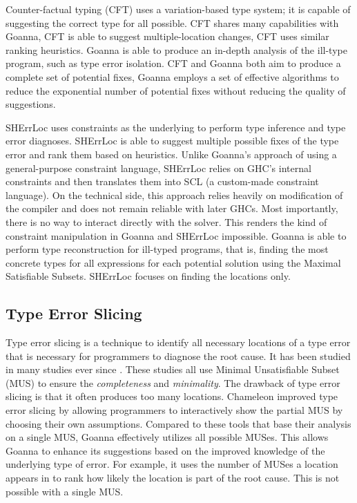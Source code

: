 \documentclass[pdflatex,sn-mathphys-num]{sn-jnl}%
\begin{document}
   Counter-factual typing (CFT) \cite{Chen2014-dz,Chen2020-ad} uses a variation-based type system; it is capable of suggesting the correct type for all possible. CFT shares many capabilities with Goanna, CFT is able to suggest multiple-location changes, CFT uses similar ranking heuristics. Goanna is able to produce an in-depth analysis of the ill-type program, such as type error isolation. CFT and Goanna both aim to produce a complete set of potential fixes, Goanna employs a set of effective algorithms to reduce the exponential number of potential fixes without reducing the quality of suggestions. 
   
   SHErrLoc \cite{Zhang2015-xy} uses constraints as the underlying to perform type inference and type error diagnoses. SHErrLoc is able to suggest multiple possible fixes of the type error and rank them based on heuristics. Unlike Goanna's approach of using a general-purpose constraint language, SHErrLoc relies on GHC's internal constraints and then translates them into SCL (a custom-made constraint language). On the technical side, this approach relies heavily on modification of the compiler and does not remain reliable with later GHCs. Most importantly, there is no way to interact directly with the solver. This renders the kind of constraint manipulation in Goanna and SHErrLoc impossible. Goanna is able to perform type reconstruction for ill-typed programs, that is, finding the most concrete types for all expressions for each potential solution using the Maximal Satisfiable Subsets. SHErrLoc focuses on finding the locations only.


\subsection{Type Error Slicing}

Type error slicing \cite{Haack2004-fr} is a technique to identify all necessary locations of a type error that is necessary for programmers to diagnose the root cause. It has been studied in many studies ever since \cite{Tip2001-qn, Heeren2003-kd}. These studies all use Minimal Unsatisfiable Subset (MUS) to ensure the \textit{completeness} and \textit{minimality}. The drawback of type error slicing is that it often produces too many locations.  Chameleon \cite{Stuckey2003-pz,Fu2021-xd} improved type error slicing by allowing programmers to interactively show the partial MUS by choosing their own assumptions. Compared to these tools that base their analysis on a single MUS, Goanna effectively utilizes all possible MUSes. This allows Goanna to enhance its suggestions based on the improved knowledge of the underlying type of error. For example, it uses the number of MUSes a location appears in to rank how likely the location is part of the root cause. This is not possible with a single MUS.  
\end{document}
